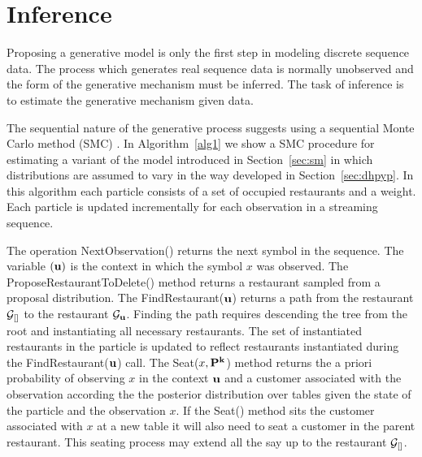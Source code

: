 \section{Inference}
\label{inference}

Proposing a generative model is only the first step in modeling discrete sequence data.  The process which generates real sequence data is normally unobserved and the form of the generative mechanism must be inferred.  The task of inference is to estimate the generative mechanism given data.

The sequential nature of the generative process suggests using a sequential Monte Carlo method (SMC) \cite{Doucet2001}.  In Algorithm~\ref{alg1} we show a SMC procedure for estimating a variant of the model introduced in Section~\ref{sec:sm} in which distributions are assumed to vary in the way developed in Section~\ref{sec:dhpyp}.  In this algorithm each particle consists of a set of occupied restaurants and a weight.  Each particle is updated incrementally for each observation in a streaming sequence.

The operation NextObservation() returns the next symbol in the sequence.  The variable $\bf(u)$ is the context in which the symbol $x$ was observed.  The ProposeRestaurantToDelete() method returns a restaurant sampled from a proposal distribution.  The FindRestaurant($\bf{u}$) returns a path from the restaurant $\G_{[]}$ to the restaurant $\G_{\bf{u}}$.  Finding the path requires descending the tree from the root and instantiating all necessary restaurants.  The set of instantiated restaurants in the particle is updated to reflect restaurants instantiated during the FindRestaurant($\bf{u}$) call.  The Seat($x,\bf{P}^k$) method returns the a priori probability of observing $x$ in the context $\bf{u}$ and a customer associated with the observation according the the posterior distribution over tables given the state of the particle and the observation $x$.  If the Seat() method sits the customer associated with $x$ at a new table it will also need to seat a customer in the parent restaurant.  This seating process may extend all the say up to the restaurant $\G_{[]}$.


